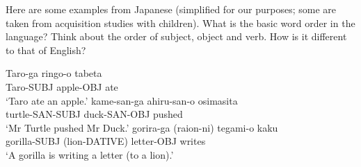 \documentclass{article}
\begin{document}
Here are some examples from Japanese (simplified for our purposes; some are taken from acquisition studies with children). What is the basic word order in the language? Think about the order of subject, object and verb. How is it different to that of English?

\ea
    \ea \gll Taro-ga ringo-o tabeta\\
            Taro-SUBJ apple-OBJ	ate\\
        \glt `Taro ate an apple.'
    \ex \gll kame-san-ga ahiru-san-o osimasita\\
            turtle-SAN-SUBJ duck-SAN-OBJ pushed\\
        \glt `Mr Turtle pushed Mr Duck.'
    \ex \gll gorira-ga (raion-ni) tegami-o kaku\\
            gorilla-SUBJ (lion-DATIVE) letter-OBJ writes\\
        \glt `A gorilla is writing a letter (to a lion).'
    \z
\z
\end{document}
